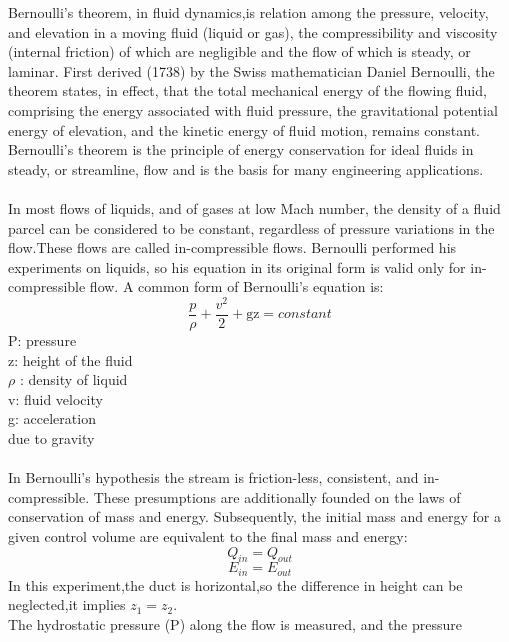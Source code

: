 \documentclass[12pt,a4paper]{article}
\begin{document}
Bernoulli’s theorem, in fluid dynamics,is relation among the pressure, velocity, and elevation in a moving fluid (liquid or gas), the compressibility and viscosity (internal friction) of which are negligible and the flow of which is steady, or laminar. First derived (1738) by the Swiss mathematician Daniel Bernoulli, the theorem states, in effect, that the total mechanical energy of the flowing fluid, comprising the energy associated with fluid pressure, the gravitational potential energy of elevation, and the kinetic energy of fluid motion, remains constant. Bernoulli’s theorem is the principle of energy conservation for ideal fluids in steady, or streamline, flow and is the basis for many engineering applications.\\
\\In most flows of liquids, and of gases at low Mach number, the density of a fluid parcel can be considered to be constant, regardless of pressure variations in the flow.These flows are called in-compressible flows. Bernoulli performed his experiments on liquids, so his equation in its original form is valid only for in-compressible flow. A common form of Bernoulli’s equation is:\\
\begin{equation}
\frac{p}{\rho} + \frac{v^2}{2} + \text{gz} = constant
\end{equation}
P: pressure\\
z: height of the fluid\\
$\rho$ : density of liquid\\
v: fluid velocity\\
g: acceleration\\
due to gravity\\
\\In Bernoulli’s hypothesis the stream is friction-less, consistent, and in-compressible. These presumptions are additionally founded on the laws of conservation of mass and energy. Subsequently, the initial mass and energy for a given control volume are equivalent to the final mass and energy:\\
\begin{equation}
Q_{in} = Q_{out}
\end{equation}
\begin{equation}
E_{in} = E_{out}
\end{equation}
In this experiment,the duct is horizontal,so the difference in height can be
neglected,it implies $z_1=z_2$.\\
The hydrostatic pressure (P) along the flow is measured, and the pressure
\end{document}
